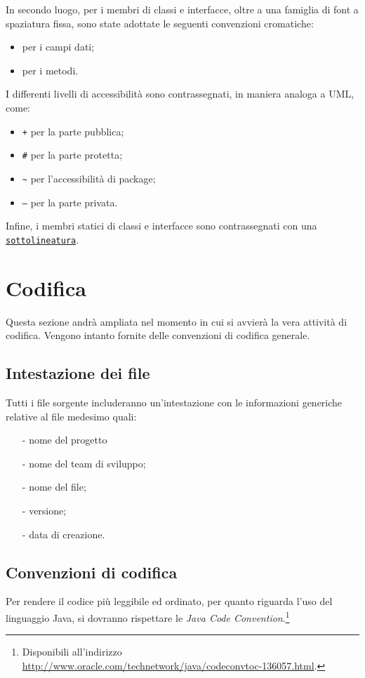 {In secondo luogo, per i membri di classi e interfacce, oltre a una famiglia di font a spaziatura fissa, sono state adottate le seguenti convenzioni cromatiche:
\begin{itemize}[noitemsep,nolistsep]
\item {} per i campi dati;
\item {} per i metodi.
\end{itemize}
I differenti livelli di accessibilità sono contrassegnati, in maniera analoga a UML, come:
\begin{itemize}
  \item \texttt{\ttfamily +} per la parte pubblica;
  \item \texttt{\ttfamily \#} per la parte protetta;
  \item \texttt{\ttfamily \textasciitilde} per  l'accessibilità di package;
  \item \texttt{\ttfamily --} per la parte privata.
\end{itemize}

Infine, i membri statici di classi e interfacce sono contrassegnati con una \underline{\texttt{sottolineatura}}.

\clearpage
\section{Codifica}
Questa sezione andrà ampliata nel momento in cui si avvierà la vera attività di codifica. Vengono intanto fornite delle convenzioni di codifica generale.

\subsection{Intestazione dei file}
Tutti i file sorgente includeranno un'intestazione con le informazioni generiche relative al file medesimo quali:
\begin{itemize}[noitemsep,nolistsep]
\item[-] nome del progetto
\item[-] nome del team di sviluppo;
\item[-] nome del file;
\item[-] versione;
\item[-] data di creazione.
\end{itemize}

\subsection{Convenzioni di codifica}
Per rendere il codice più leggibile ed ordinato, per quanto riguarda l'uso del linguaggio Java, si dovranno rispettare le \textit{Java Code Convention}.\footnote{%
Disponibili all'indirizzo \url{http://www.oracle.com/technetwork/java/codeconvtoc-136057.html}.
}

}

